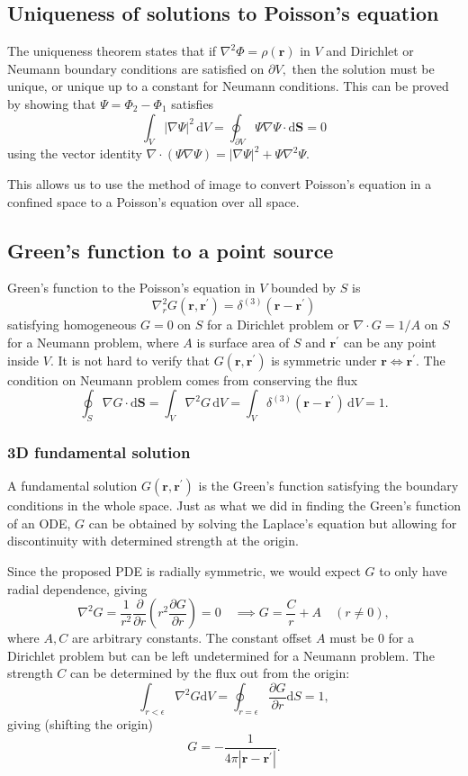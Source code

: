 \documentclass{article}
\begin{document}
\subsection{Uniqueness of solutions to Poisson's equation} 
The uniqueness theorem states that if $\nabla^{2} \Phi = \rho(\mathbf{r})$ in $V$ and Dirichlet or Neumann boundary conditions are satisfied on $\partial V,$ then the solution must be unique, or unique up to a constant for Neumann conditions. This can be proved by showing that $\Psi = \Phi_2 - \Phi_1 $ satisfies 
\[
\int_{V}^{} \left\vert \nabla \Psi  \right\vert ^{2}  \,\mathrm{d}V  = 
    \oint_{\partial V} \Psi \nabla \Psi \cdot \mathrm{d}\mathbf{S} = 0
\]
using the vector identity $\boxed{\nabla\cdot(\Psi \nabla \Psi) = \left\vert \nabla \Psi  \right\vert ^{2} + \Psi \nabla ^{2} \Psi}. $ 

This allows us to use the method of image to convert Poisson's equation in a confined space to a Poisson's equation over all space. 
\subsection{Green's function to a point source}
Green's function to the Poisson's equation in $V$ bounded by $S$ is 
\[
    \boxed{
        \nabla_r ^{2} G(\mathbf{r}, \mathbf{r^\prime }) = \delta^{(3)}(\mathbf{r}-\mathbf{r^\prime })
    }
\]
satisfying homogeneous $\boxed{G = 0 \text{ on } S}$ for a Dirichlet problem or $\boxed{\nabla \cdot G = 1/A \text{ on } S}$ for a Neumann problem, where $A$ is surface area of $S$ and $\mathbf{r^\prime }$ can be any point inside $V.$ It is not hard to verify that $G(\mathbf{r}, \mathbf{r^\prime } )$ is symmetric under $\mathbf{r}  \Leftrightarrow \mathbf{r^\prime }.$ The condition on Neumann problem comes from conserving the flux 
\[
    \oint_S \nabla G \cdot \mathrm{d}\mathbf{S} = \int_{V}^{} \nabla ^{2} G \,\mathrm{d}V = \int_{V}^{} \delta^{(3)}(\mathbf{r}-\mathbf{r^\prime }) \,\mathrm{d}V=1. 
\]
\subsubsection{3D fundamental solution}
A fundamental solution $G(\mathbf{r}, \mathbf{r^\prime })$ is the Green's function satisfying the boundary conditions in the whole space. Just as what we did in finding the Green's function of an ODE, $G$ can be obtained by solving the Laplace's equation but allowing for discontinuity with determined strength at the origin. 

Since the proposed PDE is radially symmetric, we would expect $G$ to only have radial dependence, giving
\[
    \nabla^{2} G = \frac{1}{r^{2} }\frac{\partial }{\partial r} \left( r^{2} \frac{\partial G}{\partial r} \right) = 0 \quad \implies  G = \frac{C}{r}+A \quad (r \neq 0),
\]
where $A, C$ are arbitrary constants. The constant offset $A$ must be $0$ for a Dirichlet problem but can be left undetermined for a Neumann problem. The strength $C$ can be determined by the flux out from the origin:
\[
    \int_{r<\epsilon} \nabla^{2} G \mathrm{d} V = \oint_{r = \epsilon } \frac{\partial G}{\partial r} \mathrm{d} S = 1, 
\]
giving (shifting the origin)
\[
    \boxed{
        G = -\frac{1}{4\pi \left\vert \mathbf{r} - \mathbf{r^\prime }  \right\vert }. 
    }
\]
\end{document}
